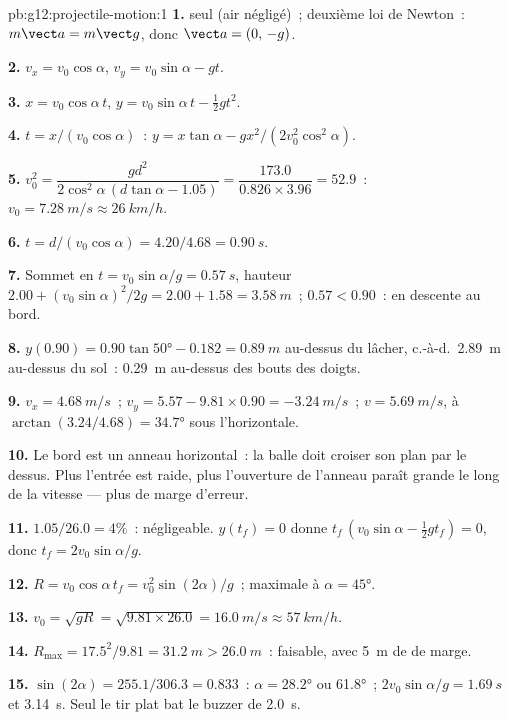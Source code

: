 \begin{solution}{pb:g12:projectile-motion:1}
\textbf{1.}  seul (air négligé)~; deuxième loi de Newton~:
$m\vect a = m\vect g$, donc $\vect a = (0,\,-g)$.

\textbf{2.} $v_x = v_0\cos\alpha$, $v_y = v_0\sin\alpha - gt$.

\textbf{3.} $x = v_0\cos\alpha\, t$,
$y = v_0\sin\alpha\, t - \tfrac12 gt^2$.

\textbf{4.} $t = x/(v_0\cos\alpha)$~:
$y = x\tan\alpha - g x^2/(2v_0^2\cos^2\alpha)$.

\textbf{5.} $v_0^2 = \dfrac{g d^2}{2\cos^2\alpha\,(d\tan\alpha -
1.05)} = \dfrac{173.0}{0.826 \times 3.96} = 52.9$~:
$v_0 = \qty{7.28}{m/s} \approx \qty{26}{km/h}$.

\textbf{6.} $t = d/(v_0\cos\alpha) = 4.20/4.68 = \qty{0.90}{s}$.

\textbf{7.} Sommet en $t = v_0\sin\alpha/g = \qty{0.57}{s}$, hauteur
$2.00 + (v_0\sin\alpha)^2/2g = 2.00 + 1.58 = \qty{3.58}{m}$~;
$0.57 < 0.90$~: en descente au bord.

\textbf{8.} $y(0.90) = 0.90\tan\ang{50} - 0.182 = \qty{0.89}{m}$
au-dessus du lâcher, c.-à-d.\ \qty{2.89}{m} au-dessus du sol~:
\qty{0.29}{m} au-dessus des bouts des doigts.

\textbf{9.} $v_x = \qty{4.68}{m/s}$~;
$v_y = 5.57 - 9.81 \times 0.90 = \qty{-3.24}{m/s}$~;
$v = \qty{5.69}{m/s}$, à $\arctan(3.24/4.68) = \ang{34.7}$ sous
l'horizontale.

\textbf{10.} Le bord est un anneau horizontal~: la balle doit croiser
son plan par le dessus. Plus l'entrée est raide, plus l'ouverture de
l'anneau paraît grande le long de la vitesse --- plus de marge
d'erreur.

\textbf{11.} $1.05/26.0 = 4\%$~: négligeable. $y(t_f) = 0$ donne
$t_f\,(v_0\sin\alpha - \tfrac12 g t_f) = 0$, donc
$t_f = 2v_0\sin\alpha/g$.

\textbf{12.} $R = v_0\cos\alpha\, t_f = v_0^2\sin(2\alpha)/g$~;
maximale à $\alpha = \ang{45}$.

\textbf{13.} $v_0 = \sqrt{gR} = \sqrt{9.81 \times 26.0} =
\qty{16.0}{m/s} \approx \qty{57}{km/h}$.

\textbf{14.} $R_{\max} = 17.5^2/9.81 = \qty{31.2}{m} >
\qty{26.0}{m}$~: faisable, avec \qty{5}{m} de 
de marge.

\textbf{15.} $\sin(2\alpha) = 255.1/306.3 = 0.833$~:
$\alpha = \ang{28.2}$ ou \ang{61.8}~; 
$2v_0\sin\alpha/g = \qty{1.69}{s}$ et \qty{3.14}{s}. Seul le tir
plat bat le buzzer de \qty{2.0}{s}.


\end{solution}
